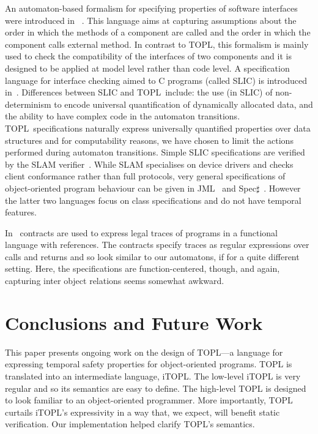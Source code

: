 \documentclass[preprint]{sigplanconf} %
\newcommand{\TPL}{TOPL}
\theoremstyle{definition}
\theoremstyle{remark}
\begin{document}
An automaton-based formalism for specifying properties of software interfaces were introduced in~\cite{dblp:conf/sigsoft/AlfaroH01} . 
This language aims at capturing assumptions about the order in which the methods of a component are called and the order in which the component calls external method.
In contrast to \TPL, this formalism is mainly used to check the compatibility of the interfaces of two components and it is designed to be applied at  model level rather than code level. A specification language for interface checking aimed to C programs (called SLIC) is introduced in~\cite{ball2002}.  
Differences between SLIC and \TPL \ include: the use (in SLIC) of
non-determinism to encode universal quantification of dynamically allocated data, and the  ability to have complex code in the automaton transitions. 
\TPL \ specifications naturally express universally quantified
properties over data structures and for computability reasons,  we
have chosen to limit the  actions performed during automaton transitions. 
Simple SLIC specifications are verified by  the SLAM verifier~\cite{dblp:conf/cav/ballr01}.
While SLAM specialises on device drivers and checks client conformance rather than full protocols, 
very general specifications of object-oriented program behaviour can be given in JML~\cite{jml} and Spec$\sharp$~\cite{DBLP:journals/jot/BarnettDFLS04}. However the latter two languages focus on class specifications and do not have temporal features.

In~\cite{disney2011} contracts are used to express legal traces of
programs in a functional language with references. The contracts
specify traces as regular expressions over calls and returns and so
look similar to our automatons, if for a quite different
setting. Here, the specifications are function-centered, though, and
again, capturing inter object relations seems somewhat awkward.


\section{Conclusions and Future Work}\label{sec:conclusions} %

This paper presents ongoing work on the design of TOPL---a language for expressing temporal safety properties for object-oriented programs.
TOPL is translated into an intermediate language, iTOPL\null.
The low-level iTOPL is very regular and so its semantics are easy to define.
The high-level TOPL is designed to look familiar to an object-oriented programmer.
More importantly, TOPL curtails iTOPL's expressivity in a way that, we expect, will benefit static verification.
Our implementation helped clarify TOPL's semantics.
\end{document}
